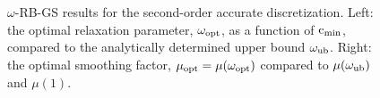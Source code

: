 \documentclass{article}
\begin{document}
{
\renewcommand{\figWidth}{7.cm}
\newcommand{\trimfig}[2]{\trimhb{#1}{#2}{.0}{.0}{.0}{.0}}
\begin{figure}[hbt]
\begin{center}
\end{center}
\caption{$\omega$-RB-GS results for the second-order accurate discretization.
Left: the optimal relaxation parameter, $\omega_{\rm opt}$, as a function of ${\rm c}_{\rm min}$,
compared to the analytically determined upper bound $\omega_{\rm ub}$. Right: the optimal smoothing
factor, $\mu_{\rm opt}=\mu(\omega_{\rm opt})$ compared to $\mu(\omega_{\rm ub})$ and $\mu(1)$. }
\label{fig:redBlack2}
\end{figure}
}

\end{document}
